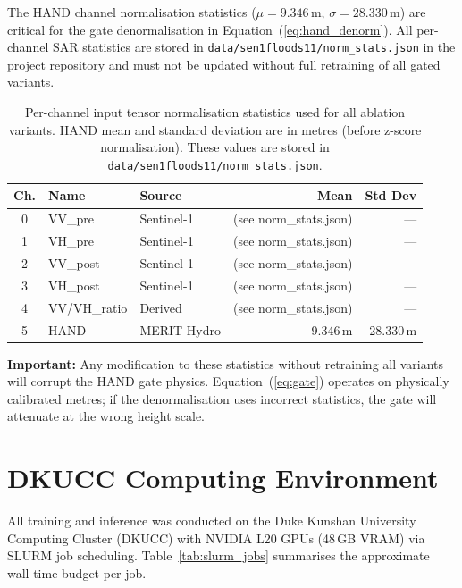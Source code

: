 \documentclass[12pt,oneside]{report}
\begin{document}
The HAND channel normalisation statistics ($\mu = 9.346$\,m,
$\sigma = 28.330$\,m) are critical for the gate denormalisation in
Equation~(\ref{eq:hand_denorm}).
All per-channel SAR statistics are stored in
\texttt{data/sen1floods11/norm\_stats.json} in the project repository and must
not be updated without full retraining of all gated variants.

\begin{table}[htbp]
\centering
\caption{Per-channel input tensor normalisation statistics used for all
ablation variants.
HAND mean and standard deviation are in metres (before z-score normalisation).
These values are stored in \texttt{data/sen1floods11/norm\_stats.json}.}
\label{tab:norm_stats}
\begin{tabular}{cllrr}
\toprule
\textbf{Ch.} & \textbf{Name} & \textbf{Source}
  & \textbf{Mean} & \textbf{Std Dev} \\
\midrule
0 & VV\_pre       & Sentinel-1  & (see norm\_stats.json) & --- \\
1 & VH\_pre       & Sentinel-1  & (see norm\_stats.json) & --- \\
2 & VV\_post      & Sentinel-1  & (see norm\_stats.json) & --- \\
3 & VH\_post      & Sentinel-1  & (see norm\_stats.json) & --- \\
4 & VV/VH\_ratio  & Derived     & (see norm\_stats.json) & --- \\
5 & HAND          & MERIT Hydro & 9.346\,m & 28.330\,m \\
\bottomrule
\end{tabular}
\end{table}

\noindent\textbf{Important:} Any modification to these statistics without
retraining all variants will corrupt the HAND gate physics.
Equation~(\ref{eq:gate}) operates on physically calibrated metres; if the
denormalisation uses incorrect statistics, the gate will attenuate at the
wrong height scale.

\chapter{DKUCC Computing Environment}
\label{app:compute}

All training and inference was conducted on the Duke Kunshan University
Computing Cluster (DKUCC) with NVIDIA L20 GPUs (48\,GB VRAM) via SLURM job
scheduling.
Table~\ref{tab:slurm_jobs} summarises the approximate wall-time budget per job.
\end{document}
